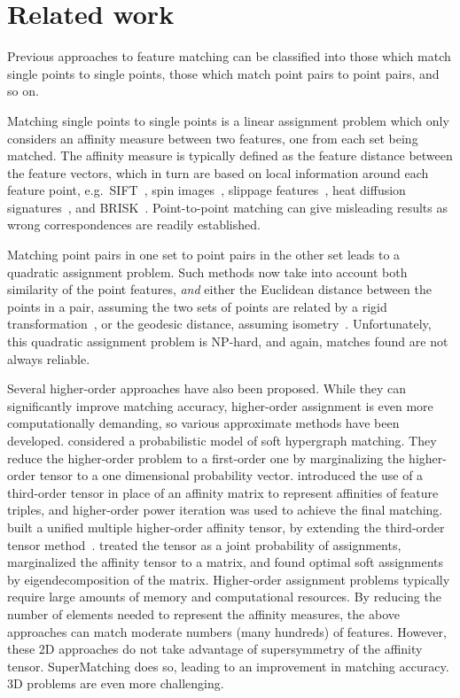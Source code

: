 \section{Related work}
\label{sec:related}

Previous approaches to feature matching can be classified into those which match single points to single points, those which match  point pairs to point pairs, and so on.

Matching single points to single points is a linear assignment problem which only considers an affinity measure between two features, one from each set being matched.
The affinity measure is typically defined as the feature distance between the feature vectors, which in turn are based on local information around each feature point,
e.g.\ SIFT~\cite{Lowe04}, spin images~\cite{Johnson99}, slippage features~\cite{Bokeloh08}, heat diffusion signatures~\cite{Sun09}, and BRISK~\cite{Leutenegger11}.
Point-to-point matching can give misleading results as wrong correspondences are readily established.

Matching point pairs  in one set to point pairs in the other set leads to a quadratic assignment problem.
Such methods now  take into account both similarity of the point features, \emph{and} either the Euclidean distance between the points in a pair,
assuming the two sets of points are related by a rigid transformation~\cite{Leordeanu05,Cour06}, or the geodesic distance, assuming isometry~\cite{li08,Tevs09,Ovsjanikov10,Tevs11,SahilliogluY11,Windheuser11}.
Unfortunately, this quadratic assignment problem is NP-hard, and again, matches found are not always reliable.

Several higher-order approaches have also been proposed.
While they can significantly improve matching accuracy,
higher-order assignment  is even more computationally demanding, so various approximate methods have been developed.
\cite{Zass08} considered a probabilistic model of soft hypergraph matching.
They reduce the higher-order problem to a first-order one by marginalizing the higher-order tensor to a one dimensional probability vector.
\cite{Duchenne09} introduced the use of a third-order tensor in place of an affinity matrix to represent affinities of feature triples,
and higher-order power iteration was used to achieve the final matching.
\cite{Aiping10} built a unified multiple higher-order affinity tensor, by extending the third-order tensor method~\cite{Duchenne09}.
\cite{Chertok10} treated the tensor as a joint probability of assignments, marginalized the affinity tensor to a matrix,
and found optimal soft assignments by eigendecomposition of the matrix.
Higher-order assignment problems typically require large amounts of memory and computational resources. By reducing the number of elements needed to represent the affinity measures, the above approaches can match moderate numbers (many hundreds) of features. However, these 2D approaches do not take advantage of supersymmetry of the affinity tensor. SuperMatching does so, leading to an improvement in matching accuracy.
3D problems are even more challenging.

